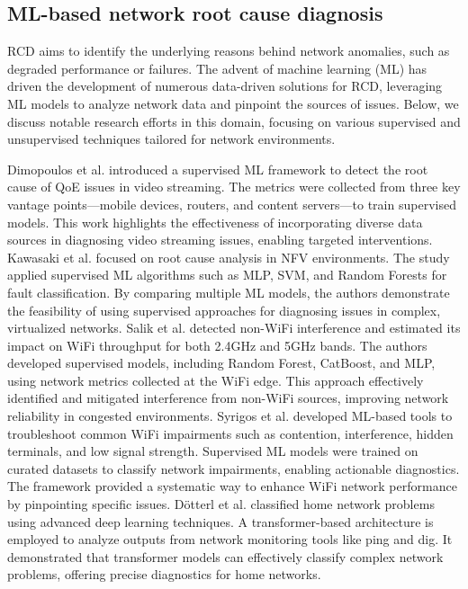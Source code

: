 \subsection{ML-based network root cause diagnosis}

\ac{RCD} aims to identify the underlying reasons behind network anomalies, such as degraded performance or failures. The advent of machine learning (ML) has driven the development of numerous data-driven solutions for RCD, leveraging ML models to analyze network data and pinpoint the sources of issues. Below, we discuss notable research efforts in this domain, focusing on various supervised and unsupervised techniques tailored for network environments.

Dimopoulos et al. \cite{dimopoulos2015identifying} introduced a supervised ML framework to detect the root cause of QoE issues in video streaming. The metrics were collected from three key vantage points—mobile devices, routers, and content servers—to train supervised models. This work highlights the effectiveness of incorporating diverse data sources in diagnosing video streaming issues, enabling targeted interventions.
Kawasaki et al. \cite{kawasaki2020comparative} focused on root cause analysis in \ac{NFV} environments. The study applied supervised ML algorithms such as MLP, SVM, and Random Forests for fault classification. By comparing multiple ML models, the authors demonstrate the feasibility of using supervised approaches for diagnosing issues in complex, virtualized networks.
Salik et al. \cite{salik2023non} detected non-WiFi interference and estimated its impact on WiFi throughput for both 2.4GHz and 5GHz bands. The authors developed supervised models, including Random Forest, CatBoost, and MLP, using network metrics collected at the WiFi edge. This approach effectively identified and mitigated interference from non-WiFi sources, improving network reliability in congested environments.
Syrigos et al. \cite{syrigos2019employment} developed ML-based tools to troubleshoot common WiFi impairments such as contention, interference, hidden terminals, and low signal strength. Supervised ML models were trained on curated datasets to classify network impairments, enabling actionable diagnostics. The framework provided a systematic way to enhance WiFi network performance by pinpointing specific issues.
Dötterl et al. \cite{dotterl2024classification} classified home network problems using advanced deep learning techniques. A transformer-based architecture is employed to analyze outputs from network monitoring tools like ping and dig. It demonstrated that transformer models can effectively classify complex network problems, offering precise diagnostics for home networks.

